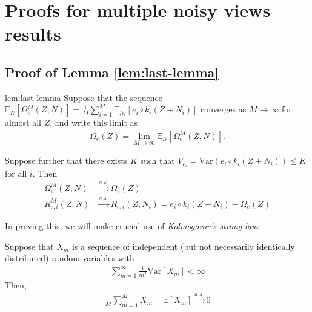 \section{Proofs for multiple noisy views results}

\subsection{Proof of Lemma \ref{lem:last-lemma}}
\label{appendix:last-lemma}

\begin{replemma}{lem:last-lemma}
	Suppose that the sequence $\mathbb{E}_{N}[\Omega_{e}^M(Z, N)] = \frac{1}{M}\sum_{i=1}^M \mathbb{E}_{N_i}[{e}_i\circ {k}_i( Z + N_i)] $ converges as $M \to \infty$ for almost all $Z$, and write this limit as
	\begin{align*}
	\Omega_e(Z) = \lim_{M\to\infty}\mathbb{E}_{N}[\Omega_{e}^M(Z, N)].
	\end{align*}
	
	Suppose further that there exists $K$ such that $V_{e_i} = \mathrm{Var}\left({e}_i \circ {k}_i(Z + N_i) \right) \leq K$ for all $i$.
	Then
	\begin{align*}
	\Omega_{e}^M(Z, N) & \overset{a.s.}{\longrightarrow} \Omega_{e}(Z) \\
	R_{e, i}^M(Z, N) & \overset{a.s.}{\longrightarrow} R_{e, i}(Z, N_i) = {e}_i\circ {k}_i( Z + N_i) - \Omega_{e}(Z)
	\end{align*}
\end{replemma}

In proving this, we will make crucial use of \emph{Kolmogorov's strong law}:

\medskip

\begin{theorem}
	Suppose that $X_m$ is a sequence of independent (but not necessarily identically distributed) random variables with
	\begin{align*}
	\sum_{m=1}^\infty \frac{1}{m^2}\mathrm{Var} [X_m] < \infty
	\end{align*}
	Then,
	\begin{align*}
	\frac{1}{M}\sum_{m=1}^M X_m - \mathbb{E}[X_m] \overset{a.s.}{\longrightarrow} 0
	\end{align*}
\end{theorem}

